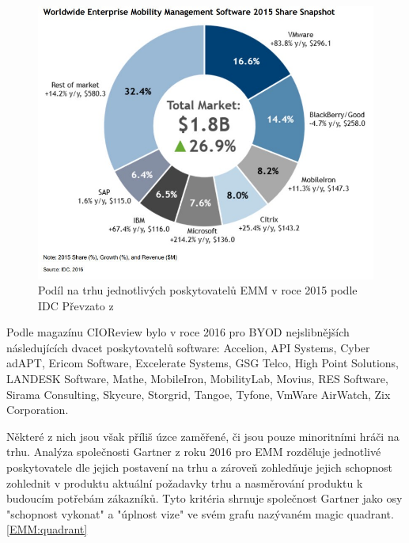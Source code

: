   \begin{figure}[h!]
\includegraphics[width=13cm]{img/IDC_EMM_2016}
\caption{Podíl na trhu jednotlivých poskytovatelů EMM v roce 2015 podle IDC Převzato z \cite{}} 
\label{EMM:podil2016}
\centering
\end{figure}

Podle magazínu CIOReview bylo v roce 2016 pro BYOD nejslibnějších následujících dvacet poskytovatelů software: Accelion, API Systems, Cyber adAPT, Ericom Software, Excelerate Systems, GSG Telco, High Point Solutions, LANDESK Software,  Mathe, MobileIron, MobilityLab, Movius, RES Software, Sirama Consulting, Skycure, Storgrid, Tangoe, Tyfone, VmWare AirWatch, Zix Corporation.

Některé z nich jsou však příliš úzce zaměřené, či jsou pouze minoritními hráči na trhu. Analýza společnosti Gartner \cite{Gartner_EMM_2016} z roku 2016 pro EMM rozděluje jednotlivé poskytovatele dle jejich postavení na trhu a zároveň zohledňuje jejich schopnost zohlednit v produktu aktuální požadavky trhu a nasměrování produktu k budoucím potřebám zákazníků. Tyto kritéria shrnuje společnost Gartner jako osy "schopnost vykonat" a "úplnost vize" ve svém grafu nazývaném magic quadrant. \ref{EMM:quadrant}



